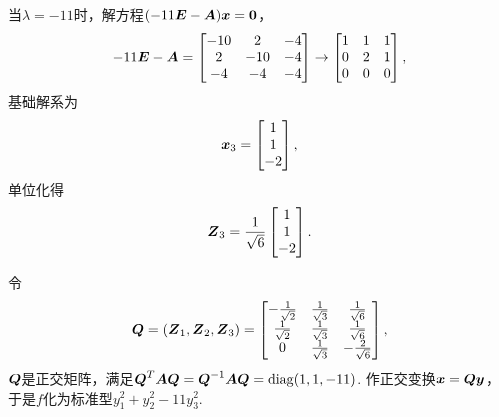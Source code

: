 \begin{example}
\begin{solution}
当\(\lambda=-11\)时，解方程\((-11\boldsymbol{E}-\boldsymbol{A})\boldsymbol{x}=\boldsymbol0\)，\begin{equation*}
	-11\boldsymbol{E}-\boldsymbol{A} = \begin{bmatrix}
		-10 & 2 & -4 \\
		2 & -10 & -4 \\
		-4 & -4 & -4
	\end{bmatrix}
	\to \begin{bmatrix}
		1 & 1 & 1 \\
		0 & 2 & 1 \\
		0 & 0 & 0
	\end{bmatrix},
\end{equation*}
基础解系为\begin{equation*}
	\boldsymbol{x}_3 = \begin{bmatrix} 1 \\ 1 \\ -2 \end{bmatrix},
\end{equation*}
单位化得\begin{equation*}
	\boldsymbol{Z}_3 = \frac{1}{\sqrt{6}} \begin{bmatrix} 1 \\ 1 \\ -2 \end{bmatrix}.
\end{equation*}

令\begin{equation*}
	\boldsymbol{Q} = (\boldsymbol{Z}_1,\boldsymbol{Z}_2,\boldsymbol{Z}_3)
	= \begin{bmatrix}
		-\frac{1}{\sqrt{2}} & \frac{1}{\sqrt{3}} & \frac{1}{\sqrt{6}} \\
		\frac{1}{\sqrt{2}} & \frac{1}{\sqrt{3}} & \frac{1}{\sqrt{6}} \\
		0 & \frac{1}{\sqrt{3}} & -\frac{2}{\sqrt{6}} \\
	\end{bmatrix},
\end{equation*}\(\boldsymbol{Q}\)是正交矩阵，满足\(\boldsymbol{Q}^T\boldsymbol{A}\boldsymbol{Q}=\boldsymbol{Q}^{-1}\boldsymbol{A}\boldsymbol{Q}=\operatorname{diag}(1,1,-11)\).
作正交变换\(\boldsymbol{x}=\boldsymbol{Q}\boldsymbol{y}\)，于是\(f\)化为标准型\(y_1^2+y_2^2-11y_3^2\).
\end{solution}
\end{example}

